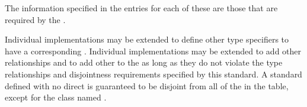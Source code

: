 The  information specified in the entries for
each of these  are those that are required by the \OS.

Individual implementations may be extended to define other type
specifiers to have a corresponding .  Individual implementations
may be extended to add other  relationships and to add other
 to the  as long as
they do not violate the type relationships and disjointness
requirements specified by this standard.
A standard  defined with no direct  is guaranteed to
be disjoint from all of the  in the table, except for the
class named .
 
\endsubSection%
